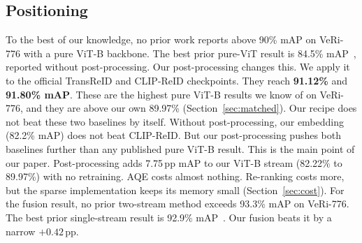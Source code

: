 \subsection{Positioning}
To the best of our knowledge, no prior work reports above 90\% mAP on VeRi-776 with a pure ViT-B backbone. The best prior pure-ViT result is 84.5\% mAP~\cite{li2023clipreid,opencodepapers2024veri}, reported without post-processing. Our post-processing changes this. We apply it to the official TransReID and CLIP-ReID checkpoints. They reach \textbf{91.12\%} and \textbf{91.80\% mAP}. These are the highest pure ViT-B results we know of on VeRi-776, and they are above our own 89.97\% (Section~\ref{sec:matched}). Our recipe does not beat these two baselines by itself. Without post-processing, our embedding (82.2\% mAP) does not beat CLIP-ReID. But our post-processing pushes both baselines further than any published pure ViT-B result. This is the main point of our paper. Post-processing adds 7.75\,pp mAP to our ViT-B stream (82.22\% to 89.97\%) with no retraining. AQE costs almost nothing. Re-ranking costs more, but the sparse implementation keeps its memory small (Section~\ref{sec:cost}). For the fusion result, no prior two-stream method exceeds 93.3\% mAP on VeRi-776. The best prior single-stream result is 92.9\% mAP~\cite{lu2025clipsenet}. Our fusion beats it by a narrow $+0.42$\,pp.

